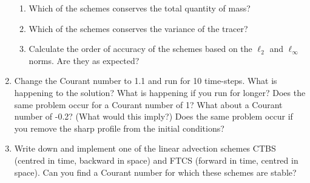 \begin{enumerate}
\begin{enumerate}
\item Which of the schemes conserves the total quantity of mass?
\item Which of the schemes conserves the variance of the tracer?
\item Calculate the order of accuracy of the schemes based on the $\ell_2$ and $\ell_\infty$ norms. Are they as expected?
\end{enumerate}

\item Change the Courant number to 1.1 and run for 10 time-steps. What is happening to the solution? What is happening if you run for longer? Does the same problem occur for a Courant number of 1? What about a Courant number of -0.2? (What would this imply?)  Does the same problem occur if you remove the sharp profile from the initial conditions?
\\ 
\item Write down and implement one of the linear advection schemes CTBS (centred in time, backward in space) and FTCS (forward in time, centred in space). Can you find a Courant number for which these schemes are stable?
\\ 
\end{enumerate}

